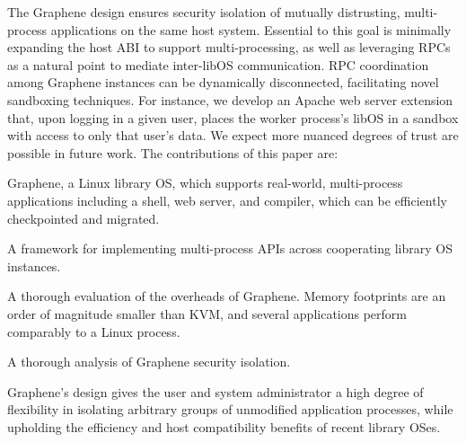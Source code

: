 
The Graphene design ensures security isolation of
mutually distrusting, multi-process
applications on the same host system.
Essential to this goal is
minimally expanding the host ABI to support multi-processing,
as well as leveraging RPCs as a natural point to mediate inter-libOS communication.
RPC coordination among Graphene instances can be dynamically disconnected, facilitating novel sandboxing
techniques.  For instance, we develop an Apache web server extension that, upon logging in a given user,
places the worker process's libOS in a sandbox with access to only that user's data.
We expect more nuanced degrees of trust are possible in future work.
The contributions of this paper are:
\begin{compactitem}
\item Graphene, a Linux library OS, which supports
  real-world, multi-process applications including a shell, web server,
  and compiler, which can be  efficiently checkpointed and migrated.
\item A framework for implementing multi-process APIs across cooperating library OS instances.
\item A thorough evaluation of the overheads of Graphene.  Memory footprints are an order of magnitude
smaller than KVM, and several applications perform comparably to a Linux process.
\item A thorough analysis of Graphene security isolation.


\end{compactitem}
Graphene's design gives the user and system administrator a high degree of flexibility
in isolating arbitrary groups of unmodified application processes,
while upholding the efficiency and host compatibility benefits of recent library OSes.


